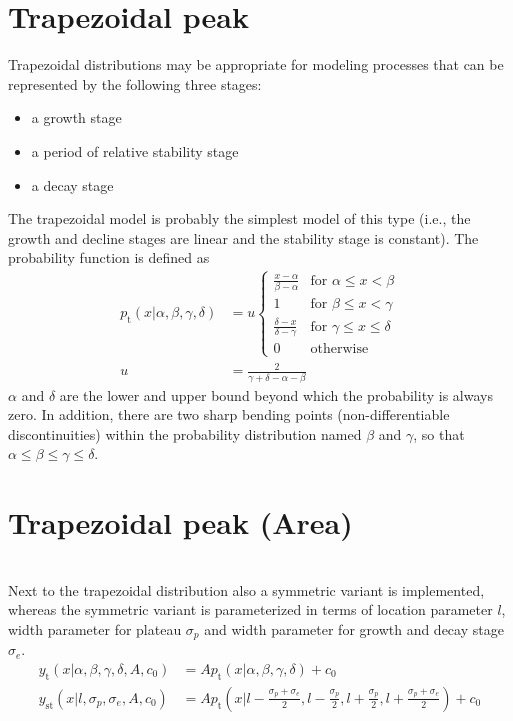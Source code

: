 \clearpage
\section{Trapezoidal peak}
\label{sec:trapezoidal}

Trapezoidal distributions may be appropriate for modeling processes that can be represented by the following three stages:
\begin{itemize}
\item a growth stage
\item a period of relative stability stage
\item a decay stage
\end{itemize}
The trapezoidal model is probably the simplest model of this type (i.e., the growth and decline stages are linear and the stability stage is constant). The probability function is defined as
\begin{align}
p_\mathrm{t}(x|\alpha,\beta,\gamma,\delta) &= u
\begin{cases}{\frac {x-\alpha}{\beta-\alpha}}&{\text{for }}\alpha\leq x<\beta\\
             1&{\text{for }}\beta\leq x<\gamma \\
             {\frac {\delta-x}{\delta-\gamma}}&{\text{for }}\gamma\leq x\leq \delta \\
             {0} &{\text{otherwise }}
\end{cases} \\
u &= \frac {2}{\gamma+\delta-\alpha-\beta}
\end{align}
$\alpha$ and $\delta$ are the lower and upper bound beyond which the probability is always zero.
 In addition, there are two sharp bending points (non-differentiable discontinuities) within the probability distribution named $\beta$ and $\gamma$, so that $\alpha\leq\beta\leq\gamma\leq\delta$.

\section{Trapezoidal peak (Area)} ~\\
\label{sec:trapezoidalArea}
Next to the trapezoidal distribution also a symmetric variant is implemented, whereas the symmetric variant is parameterized in terms of location parameter $l$, width parameter for plateau $\sigma_p$ and width parameter for growth and decay stage $\sigma_e$.
\begin{align}\label{eq:trapezoidalpeakArea}
y_\mathrm{t}(x|\alpha,\beta,\gamma,\delta,A,c_0) &= A\textstyle p_\mathrm{t}(x|\alpha,\beta,\gamma,\delta) +c_0 \\
y_\mathrm{st}(x|l,\sigma_p,\sigma_e,A,c_0) &= A \textstyle p_\mathrm{t}\left(x|l-\frac{\sigma_p+\sigma_e}{2},l-\frac{\sigma_p}{2},l+\frac{\sigma_p}{2},l+\frac{\sigma_p+\sigma_e}{2}\right) +c_0
\end{align} 


